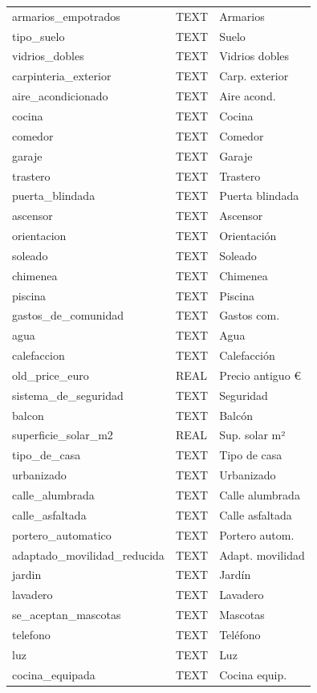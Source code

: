 \begin{longtable}{lll}
armarios\_empotrados & TEXT & Armarios \\
tipo\_suelo & TEXT & Suelo \\
vidrios\_dobles & TEXT & Vidrios dobles \\
carpinteria\_exterior & TEXT & Carp. exterior \\
aire\_acondicionado & TEXT & Aire acond. \\
cocina & TEXT & Cocina \\
comedor & TEXT & Comedor \\
garaje & TEXT & Garaje \\
trastero & TEXT & Trastero \\
puerta\_blindada & TEXT & Puerta blindada \\
ascensor & TEXT & Ascensor \\
orientacion & TEXT & Orientación \\
soleado & TEXT & Soleado \\
chimenea & TEXT & Chimenea \\
piscina & TEXT & Piscina \\
gastos\_de\_comunidad & TEXT & Gastos com. \\
agua & TEXT & Agua \\
calefaccion & TEXT & Calefacción \\
old\_price\_euro & REAL & Precio antiguo € \\
sistema\_de\_seguridad & TEXT & Seguridad \\
balcon & TEXT & Balcón \\
superficie\_solar\_m2 & REAL & Sup. solar m² \\
tipo\_de\_casa & TEXT & Tipo de casa \\
urbanizado & TEXT & Urbanizado \\
calle\_alumbrada & TEXT & Calle alumbrada \\
calle\_asfaltada & TEXT & Calle asfaltada \\
portero\_automatico & TEXT & Portero autom. \\
adaptado\_movilidad\_reducida & TEXT & Adapt. movilidad \\
jardin & TEXT & Jardín \\
lavadero & TEXT & Lavadero \\
se\_aceptan\_mascotas & TEXT & Mascotas \\
telefono & TEXT & Teléfono \\
luz & TEXT & Luz \\
cocina\_equipada & TEXT & Cocina equip. \\

\end{longtable}
